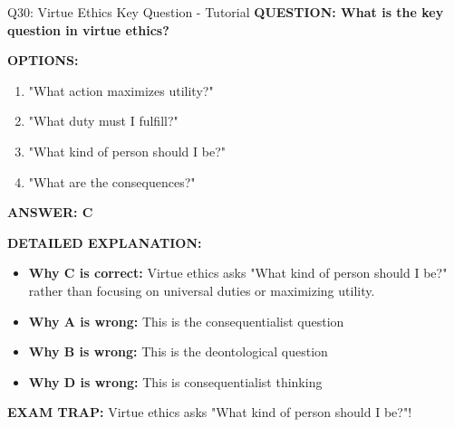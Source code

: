 \documentclass[8pt]{beamer}
\begin{document}
	\begin{frame}{Q30: Virtue Ethics Key Question - Tutorial}
		\fontsize{6.5}{7.5}\selectfont
		\textbf{QUESTION: What is the key question in virtue ethics?}
		
		\vspace{0.1cm}
		\textbf{OPTIONS:}
		\begin{enumerate}
			\item "What action maximizes utility?"
			\item "What duty must I fulfill?"
			\item "What kind of person should I be?"
			\item "What are the consequences?"
		\end{enumerate}
		
		\vspace{0.1cm}
		\textcolor{myblue}{\textbf{ANSWER: C}}
		
		\vspace{0.1cm}
		\textbf{DETAILED EXPLANATION:}
		\begin{itemize}
			\item \textbf{Why C is correct:} Virtue ethics asks "What kind of person should I be?" rather than focusing on universal duties or maximizing utility.
			\item \textbf{Why A is wrong:} This is the consequentialist question
			\item \textbf{Why B is wrong:} This is the deontological question
			\item \textbf{Why D is wrong:} This is consequentialist thinking
		\end{itemize}
		
		\textcolor{myred}{\textbf{EXAM TRAP:}} Virtue ethics asks \textcolor{myblue}{"What kind of person should I be?"}!
	\end{frame}
	
\end{document}
